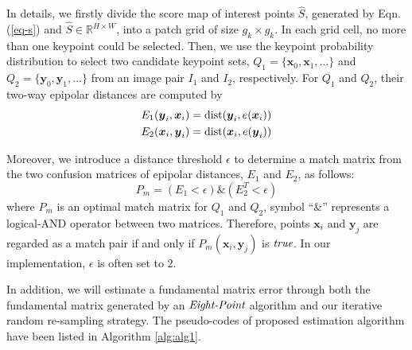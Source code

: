\documentclass[journal]{IEEEtran}
\begin{document}
In details, we firstly divide the score map of interest points $\widehat{S}$, generated by Eqn. (\ref{eq-s}) and $\widehat{S} \in \mathbb{R}^{H\times W}$, into a patch grid of size $g_k\times g_k$. In each grid cell, no more than one keypoint could be selected. Then, we use the keypoint probability distribution to select two candidate keypoint sets, $Q_1=\{\boldsymbol{x}_0,\boldsymbol{x}_1,...\}$ and $Q_2=\{\boldsymbol{y}_0,\boldsymbol{y}_1,...\}$ from an image pair $I_1$ and $I_2$, respectively. For $Q_1$ and $Q_2$, their two-way epipolar distances are computed by
\begin{gather}\label{eq-ed}
        E_{1}(\boldsymbol{y}_{i},\boldsymbol{x}_{i})={\rm dist}(\boldsymbol{y}_{i},e(\boldsymbol{x}_{i})) \\
        E_{2}(\boldsymbol{x}_{i},\boldsymbol{y}_{i})={\rm dist}(\boldsymbol{x}_{i},e(\boldsymbol{y}_{i}))
\end{gather}


Moreover, we introduce a distance threshold $\epsilon$ to determine a match matrix from the two confusion matrices of epipolar distances, $E_{1}$ and $E_{2}$, as follows:
\begin{equation}\label{6}
        P_{m}=(E_1<\epsilon) \& (E_2^{T}<\epsilon)
\end{equation}
where $P_m$ is an optimal match matrix for $Q_1$ and $Q_2$, symbol ``\&'' represents a logical-AND operator between two matrices.
Therefore, points $\boldsymbol{x}_i$ and $\boldsymbol{y}_j$ are regarded as a match pair if and only if $P_{m}(\boldsymbol{x}_i,\boldsymbol{y}_j)$ is $\emph{true}$. In our implementation, $\epsilon$ is often set to $2$. 

In addition, we will estimate a fundamental matrix error through both the fundamental matrix generated by an $\emph{Eight-Point}$ algorithm \cite{Hartley2004} and our iterative random re-sampling strategy. The pseudo-codes of proposed estimation algorithm have been listed in Algorithm \ref{alg:alg1}.
\end{document}
